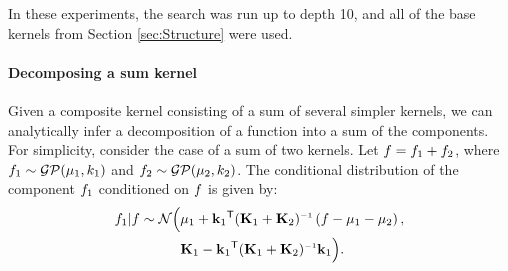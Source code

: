 \documentclass[twoside]{article}
\begin{document}
In these experiments, the search was run up to depth 10, and all of the base kernels from Section \ref{sec:Structure} were used.




\paragraph{Decomposing a sum kernel}
\label{sec:decomposing}
Given a composite kernel consisting of a sum of several simpler kernels, we can analytically infer a decomposition of a function into a sum of the components.
For simplicity, consider the case of a sum of two kernels.
Let $f = f_1 + f_2$, where $f_1 \sim \mathcal{GP}( {\bf{\mu}}_1, k_1)$ and $f_2 \sim \mathcal{GP}( {\bf{\mu}}_2, k_2)$.
The conditional distribution of the component $f_1$ conditioned on $f$ is given by:
\begin{align}
\function_1 | \function \sim \mathcal{N} \Big( & \vmu_1 + \vk_1\tra (\vK_1 + \vK_2)\inv \left( \function - \vmu_1 - \vmu_2 \right), \nonumber \\
& \vK_1 - \vk_1\tra (\vK_1 + \vK_2)\inv \vk_1 \Big).
\end{align}
\end{document}
